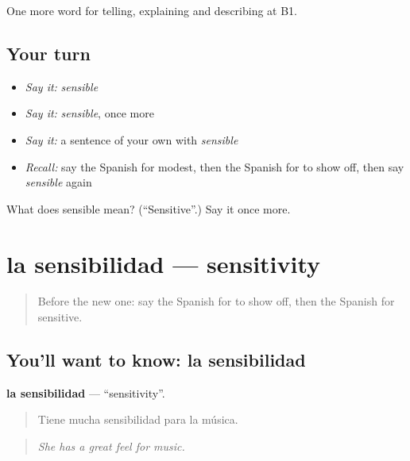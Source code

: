 \begin{grammarlens}[title={What you've built}]
One more word for telling, explaining and describing at B1.
\end{grammarlens}

\subsection*{Your turn}
\begin{itemize}
\raggedright
  \item \emph{Say it:} \emph{sensible}
  \item \emph{Say it:} \emph{sensible}, once more
  \item \emph{Say it:} a sentence of your own with \emph{sensible}
  \item \emph{Recall:} say the Spanish for modest, then the Spanish for to show off, then say \emph{sensible} again
\end{itemize}

\begin{tcolorbox}[breakable,colback=teal!4,colframe=teal!35!black,title={Before you move on}]
What does sensible mean? (\textquotedblleft{}Sensitive\textquotedblright{}.) Say it once more.
\end{tcolorbox}
\section[la sensibilidad]{la sensibilidad — sensitivity}

\label{lesson:ES-C727-sensibilidad}



\begin{quote}
Before the new one: say the Spanish for to show off, then the Spanish for sensitive.
\end{quote}

\subsection*{You'll want to know: la sensibilidad}
\textbf{la sensibilidad} — \textquotedblleft{}sensitivity\textquotedblright{}.

\begin{quote}
Tiene mucha sensibilidad para la música.
\end{quote}

\begin{quote}
\emph{She has a great feel for music.}
\end{quote}

